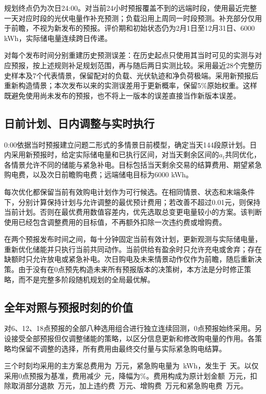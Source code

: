 规划终点仍为次日24:00。对当前24小时预报覆盖不到的远端时段，使用最近完整一天对应时段的光伏电量作补充预测；负载沿用上周同一时段预测。补充部分仅用于前瞻，不视为新发布的预报。评价期和初始状态仍为2月1日至12月31日、6000 kWh，实际储电量连续跨日传递。

对每个发布时间分别重建历史预测误差：在历史起点只使用其当时可见的实测与对应预报，按上述规则补足规划范围，再与随后两日实测比较。采用最近28个完整历史样本及7个代表情景，保留配对的负载、光伏轨迹和净负荷极端。采用新预报后重新构造情景；本次发布以来的实测误差用于更新概率，保留5\%原始权重。这样既避免使用尚未发布的预报，也不将上一版本的误差直接当作新版本误差。

\subsection{日前计划、日内调整与实时执行}
0:00依据当时预报建立问题二形式的多情景日前模型，确定当天144段原计划。日内采用新预报时，给定实际储电量和已执行区间，对当天剩余区间的$a_t$共同优化，各情景允许不同的储能与紧急补电。目标包括当天剩余交易的结算费用、期望紧急购电费，以及次日前瞻购电费；远端储电目标为6000 kWh。

每次优化都保留当前有效购电计划作为可行候选。在相同情景、状态和末端条件下，分别计算保持计划与允许调整的最优预计费用；若改善不超过0.01元，则保持当前计划。否则在最优费用数值容差内，优先选取总变更电量较小的方案。该判断使用已经包含调整费用的目标值，不再额外扣除一次违约费或增购费。

在两个预报发布时间之间，每十分钟固定当前有效计划，更新观测与实际储电量，重新优化储能并只执行当前共同动作。当前供给有盈余时只允许充电或舍弃；存在缺额时只允许放电或紧急补电。次日购电及未来情景动作仅作为前瞻，随后重新决策。由于没有在0点预先构造未来所有预报版本的决策树，本方法是分时修正策略，而不是完整多阶段随机规划的全局最优解。

\subsection{全年对照与预报时刻的价值}
对6、12、18点预报的全部八种选用组合进行独立连续回测，0点预报始终采用。另设接受全部预报但仅调整储能的策略，以区分信息更新和修改购电量的作用。各策略均保留不调整的选择，所有费用由最终交付量与实际紧急购电结算。

\begin{table}[htbp]\centering\scriptsize
\caption{问题三各策略的334天实际运行结果}\label{tab:q3compare}
\resizebox{\textwidth}{!}{}
\end{table}
三个时刻均采用的主方案总费用为\QthreeCost\ 万元，紧急购电量为\QthreeEmergency\ kWh，发生于\QthreeDays\ 天。以仅采用0点预报为基准，费用减少\QthreeDifference\ 元，降幅为\QthreeSaving\%。费用构成为原计划金额\QthreePlanCost\ 万元，扣除取消部分退款\QthreeRefund\ 万元，加上违约费\QthreePenalty\ 万元、增购费\QthreeExtra\ 万元和紧急购电费\QthreeEmergencyCost\ 万元。

